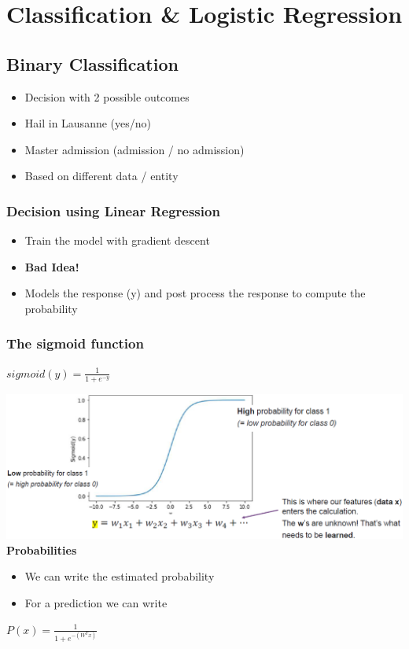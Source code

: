 \section{Classification \& Logistic Regression}
\subsection{Binary Classification}
\begin{itemize}
    \item Decision with 2 possible outcomes
    \item Hail in Lausanne (yes/no)
    \item Master admission (admission / no admission)
    \item Based on different data / entity
\end{itemize}

\subsubsection{Decision using Linear Regression}
\begin{itemize}
    \item Train the model with gradient descent
    \item \textbf{Bad Idea!}
    \item Models the response (y) and post process the response to compute the probability
\end{itemize}

\subsubsection{The sigmoid function}
\begin{center}
    $sigmoid(y) = \frac{1}{1 + e^{-y}}$
\end{center}
\includegraphics[width=\linewidth]{./img/sigmoid.png}
\textbf{Probabilities}
\begin{itemize}
    \item We can write the estimated probability
    \item For a prediction we can write
\end{itemize}
\begin{center}
    $P(x) = \frac{1}{1 + e^{-(W^{T}x)}}$
\end{center}

